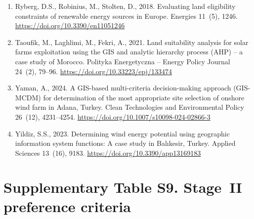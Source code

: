 \documentclass[11pt,a4paper]{article}
\begin{document}
\begin{enumerate}
\item Ryberg, D.S., Robinius, M., Stolten, D., 2018. Evaluating land eligibility constraints of renewable energy sources in Europe. Energies 11~(5), 1246. \url{https://doi.org/10.3390/en11051246}
\item Taoufik, M., Laghlimi, M., Fekri, A., 2021. Land suitability analysis for solar farms exploitation using the GIS and analytic hierarchy process (AHP) -- a case study of Morocco. Polityka Energetyczna -- Energy Policy Journal 24~(2), 79--96. \url{https://doi.org/10.33223/epj/133474}
\item Yaman, A., 2024. A GIS-based multi-criteria decision-making approach (GIS-MCDM) for determination of the most appropriate site selection of onshore wind farm in Adana, Turkey. Clean Technologies and Environmental Policy 26~(12), 4231--4254. \url{https://doi.org/10.1007/s10098-024-02866-3}
\item Yildiz, S.S., 2023. Determining wind energy potential using geographic information system functions: A case study in Bal{\i}kesir, Turkey. Applied Sciences 13~(16), 9183. \url{https://doi.org/10.3390/app13169183}
\end{enumerate}


\newpage\section{Supplementary Table S9. Stage~II preference criteria}
\end{document}
